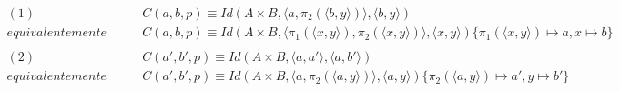 \begin{align*}
    (1)\qquad &C(a, b, p) \equiv Id(A \times B, \langle a, \pi_2(\langle b, y\rangle)\rangle, \langle b, y\rangle)\\
    equivalentemente \qquad&C(a, b, p) \equiv Id(A \times B, \langle \pi_1(\langle x, y\rangle), \pi_2(\langle x, y\rangle)\rangle, \langle x, y\rangle)\{\pi_1(\langle x, y\rangle) \mapsto a, x \mapsto b\}\\\\
    (2)\qquad &C(a', b', p) \equiv Id(A \times B, \langle a, a'\rangle, \langle a, b'\rangle)\\
    equivalentemente \qquad&C(a', b', p) \equiv Id(A \times B, \langle a, \pi_2(\langle a, y\rangle)\rangle, \langle a, y\rangle)\{\pi_2(\langle a, y\rangle) \mapsto a', y \mapsto b'\}
\end{align*}